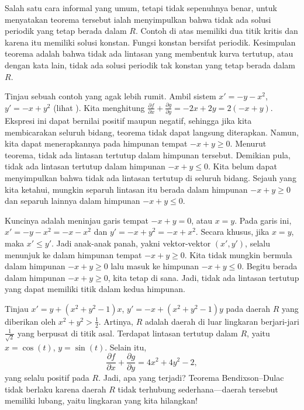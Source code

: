 Salah satu cara informal yang umum, tetapi tidak sepenuhnya benar, untuk
menyatakan teorema tersebut ialah menyimpulkan bahwa tidak ada solusi periodik
yang tetap berada dalam $R$. Contoh di atas memiliki dua titik kritis dan
karena itu memiliki solusi konstan. Fungsi konstan bersifat periodik.
Kesimpulan teorema adalah bahwa tidak ada lintasan yang membentuk kurva
tertutup, atau dengan kata lain, tidak ada solusi periodik tak konstan yang
tetap berada dalam $R$.

\begin{example}
Tinjau sebuah contoh yang agak lebih rumit.
Ambil sistem $x'=-y-x^2$, $y'=-x+y^2$ (lihat
). Kita menghitung
$\frac{\partial f}{\partial x} + \frac{\partial g}{\partial y} =
-2x + 2y=2(-x+y)$. Ekspresi ini dapat bernilai positif maupun negatif, sehingga jika kita
membicarakan seluruh bidang, teorema tidak dapat langsung diterapkan.
Namun, kita dapat menerapkannya pada himpunan tempat $-x+y \geq 0$.
Menurut teorema, tidak ada lintasan tertutup dalam himpunan tersebut.
Demikian pula, tidak ada lintasan tertutup dalam himpunan
$-x+y \leq 0$. Kita belum dapat menyimpulkan bahwa tidak ada lintasan
tertutup di seluruh bidang. Sejauh yang kita ketahui, mungkin separuh
lintasan itu berada dalam himpunan $-x+y \geq 0$ dan separuh lainnya dalam
himpunan $-x+y \leq 0$.

Kuncinya adalah meninjau garis tempat $-x+y=0$, atau $x=y$.
Pada garis ini,
$x' = -y-x^2 = -x-x^2$ dan $y' = -x+y^2 = -x+x^2$.
Secara khusus, jika $x=y$, maka $x' \leq y'$. Jadi anak-anak panah, yakni
vektor-vektor $(x',y')$, selalu menunjuk ke dalam himpunan tempat
$-x+y \geq 0$. Kita tidak mungkin bermula dalam himpunan
$-x+y \geq 0$ lalu masuk ke himpunan $-x+y \leq 0$. Begitu berada dalam
himpunan $-x+y \geq 0$, kita tetap di sana. Jadi, tidak ada lintasan
tertutup yang dapat memiliki titik dalam kedua himpunan.
\end{example}

\begin{example}
Tinjau
$x' = y+(x^2+y^2-1)x$,
$y' = -x +(x^2+y^2-1)y$ pada daerah $R$ yang diberikan oleh
$x^2+y^2 > \frac{1}{2}$. Artinya, $R$ adalah daerah di luar lingkaran
berjari-jari $\frac{1}{\sqrt{2}}$ yang berpusat di titik asal. Terdapat
lintasan tertutup dalam $R$, yaitu $x=\cos(t)$, $y=\sin(t)$.
Selain itu,
\begin{equation*}
\frac{\partial f}{\partial x} + 
\frac{\partial g}{\partial y} = 4x^2+4y^2-2 ,
\end{equation*}
yang selalu positif pada $R$. Jadi, apa yang terjadi? Teorema
Bendixson--Dulac tidak berlaku karena daerah $R$ tidak terhubung
sederhana---daerah tersebut memiliki lubang, yaitu lingkaran yang kita
hilangkan!
\end{example}

